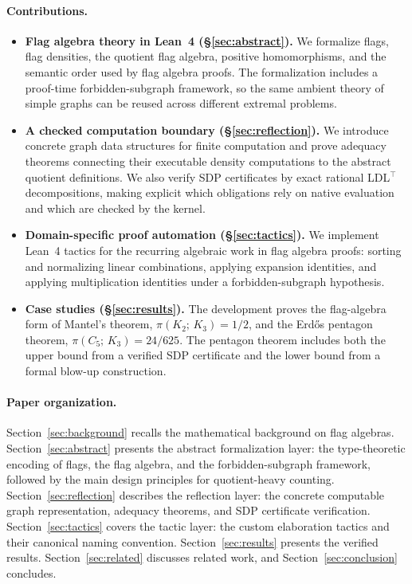 \documentclass{article}
\newcommand{\tdensity}[2]{\pi(#1;\,#2)}
\begin{document}
\paragraph{Contributions.}
\begin{itemize}
  \item \textbf{Flag algebra theory in Lean~4 (\S\ref{sec:abstract}).}
    We formalize flags, flag densities, the quotient flag algebra, positive
    homomorphisms, and the semantic order used by flag algebra proofs.  The
    formalization includes a proof-time forbidden-subgraph framework, so the
    same ambient theory of simple graphs can be reused across different
    extremal problems.

  \item \textbf{A checked computation boundary (\S\ref{sec:reflection}).}
    We introduce concrete graph data structures for finite computation and
    prove adequacy theorems connecting their executable density computations
    to the abstract quotient definitions.  We also verify SDP certificates by
    exact rational LDL$^\top$ decompositions, making explicit which obligations
    rely on native evaluation and which are checked by the kernel.

  \item \textbf{Domain-specific proof automation (\S\ref{sec:tactics}).}
    We implement Lean~4 tactics for the recurring algebraic work in flag
    algebra proofs: sorting and normalizing linear combinations, applying
    expansion identities, and applying multiplication identities under a
    forbidden-subgraph hypothesis.

  \item \textbf{Case studies (\S\ref{sec:results}).}
    The development proves the flag-algebra form of Mantel's theorem,
    $\tdensity{K_2}{K_3}=1/2$, and the Erd\H{o}s pentagon theorem,
    $\tdensity{C_5}{K_3}=24/625$.  The pentagon theorem includes both the
    upper bound from a verified SDP certificate and the lower bound from a
    formal blow-up construction.
\end{itemize}

\paragraph{Paper organization.}
Section~\ref{sec:background} recalls the mathematical background on flag
algebras.
Section~\ref{sec:abstract} presents the abstract formalization layer:
the type-theoretic encoding of flags, the flag algebra, and the
forbidden-subgraph framework, followed by the main design principles for
quotient-heavy counting.
Section~\ref{sec:reflection} describes the reflection layer: the concrete
computable graph representation, adequacy theorems, and SDP certificate
verification.
Section~\ref{sec:tactics} covers the tactic layer: the custom elaboration
tactics and their canonical naming convention.
Section~\ref{sec:results} presents the verified results.
Section~\ref{sec:related} discusses related work, and
Section~\ref{sec:conclusion} concludes.
\end{document}
